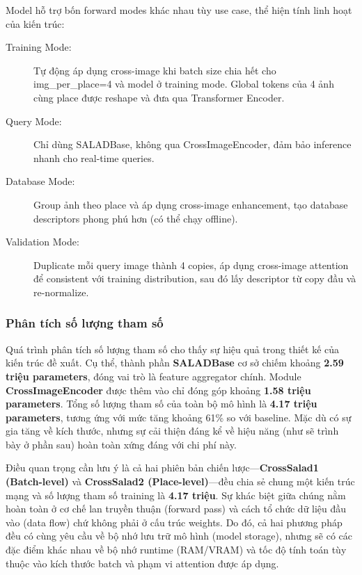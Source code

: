 \documentclass[12pt,a4paper]{article}
\begin{document}
    Model hỗ trợ bốn forward modes khác nhau tùy use case, thể hiện tính linh hoạt của kiến trúc:
    
    \begin{description}
        \item[Training Mode:] Tự động áp dụng cross-image khi batch size chia hết cho img\_per\_place=4 và model ở training mode. Global tokens của 4 ảnh cùng place được reshape và đưa qua Transformer Encoder.
        \item[Query Mode:] Chỉ dùng SALADBase, không qua CrossImageEncoder, đảm bảo inference nhanh cho real-time queries.
        \item[Database Mode:] Group ảnh theo place và áp dụng cross-image enhancement, tạo database descriptors phong phú hơn (có thể chạy offline).
        \item[Validation Mode:] Duplicate mỗi query image thành 4 copies, áp dụng cross-image attention để consistent với training distribution, sau đó lấy descriptor từ copy đầu và re-normalize.
    \end{description}

    \subsubsection{Phân tích số lượng tham số}

    Quá trình phân tích số lượng tham số cho thấy sự hiệu quả trong thiết kế của kiến trúc đề xuất. Cụ thể, thành phần \textbf{SALADBase} cơ sở chiếm khoảng \textbf{2.59 triệu parameters}, đóng vai trò là feature aggregator chính. Module \textbf{CrossImageEncoder} được thêm vào chỉ đóng góp khoảng \textbf{1.58 triệu parameters}. Tổng số lượng tham số của toàn bộ mô hình là \textbf{4.17 triệu parameters}, tương ứng với mức tăng khoảng 61\% so với baseline. Mặc dù có sự gia tăng về kích thước, nhưng sự cải thiện đáng kể về hiệu năng (như sẽ trình bày ở phần sau) hoàn toàn xứng đáng với chi phí này.

    Điều quan trọng cần lưu ý là cả hai phiên bản chiến lược—\textbf{CrossSalad1 (Batch-level)} và \textbf{CrossSalad2 (Place-level)}—đều chia sẻ chung một kiến trúc mạng và số lượng tham số training là \textbf{4.17 triệu}. Sự khác biệt giữa chúng nằm hoàn toàn ở cơ chế lan truyền thuận (forward pass) và cách tổ chức dữ liệu đầu vào (data flow) chứ không phải ở cấu trúc weights. Do đó, cả hai phương pháp đều có cùng yêu cầu về bộ nhớ lưu trữ mô hình (model storage), nhưng sẽ có các đặc điểm khác nhau về bộ nhớ runtime (RAM/VRAM) và tốc độ tính toán tùy thuộc vào kích thước batch và phạm vi attention được áp dụng.
    
\end{document}
